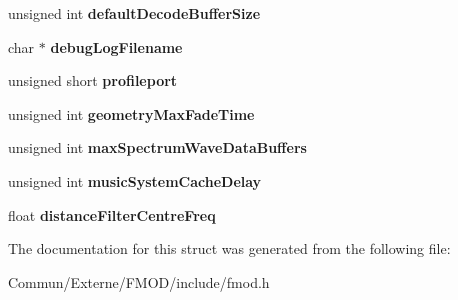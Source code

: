 \begin{DoxyCompactItemize}
\item 
unsigned int {\bfseries default\+Decode\+Buffer\+Size}\hypertarget{struct_f_m_o_d___a_d_v_a_n_c_e_d_s_e_t_t_i_n_g_s_a8b2d2802cd34875f10d319c8f363e399}{}\label{struct_f_m_o_d___a_d_v_a_n_c_e_d_s_e_t_t_i_n_g_s_a8b2d2802cd34875f10d319c8f363e399}

\item 
char $\ast$ {\bfseries debug\+Log\+Filename}\hypertarget{struct_f_m_o_d___a_d_v_a_n_c_e_d_s_e_t_t_i_n_g_s_a00d10a918d3414c8f4bde3664f01b44f}{}\label{struct_f_m_o_d___a_d_v_a_n_c_e_d_s_e_t_t_i_n_g_s_a00d10a918d3414c8f4bde3664f01b44f}

\item 
unsigned short {\bfseries profileport}\hypertarget{struct_f_m_o_d___a_d_v_a_n_c_e_d_s_e_t_t_i_n_g_s_a5d12c84c6911facd30fcba7ab0dd7faa}{}\label{struct_f_m_o_d___a_d_v_a_n_c_e_d_s_e_t_t_i_n_g_s_a5d12c84c6911facd30fcba7ab0dd7faa}

\item 
unsigned int {\bfseries geometry\+Max\+Fade\+Time}\hypertarget{struct_f_m_o_d___a_d_v_a_n_c_e_d_s_e_t_t_i_n_g_s_a973568fb1ec638193a0b0198d4165558}{}\label{struct_f_m_o_d___a_d_v_a_n_c_e_d_s_e_t_t_i_n_g_s_a973568fb1ec638193a0b0198d4165558}

\item 
unsigned int {\bfseries max\+Spectrum\+Wave\+Data\+Buffers}\hypertarget{struct_f_m_o_d___a_d_v_a_n_c_e_d_s_e_t_t_i_n_g_s_a0404a31fe61b9d4e2340125a2a38a00d}{}\label{struct_f_m_o_d___a_d_v_a_n_c_e_d_s_e_t_t_i_n_g_s_a0404a31fe61b9d4e2340125a2a38a00d}

\item 
unsigned int {\bfseries music\+System\+Cache\+Delay}\hypertarget{struct_f_m_o_d___a_d_v_a_n_c_e_d_s_e_t_t_i_n_g_s_abb66bb0cce280bd12f4092d2b3f642d1}{}\label{struct_f_m_o_d___a_d_v_a_n_c_e_d_s_e_t_t_i_n_g_s_abb66bb0cce280bd12f4092d2b3f642d1}

\item 
float {\bfseries distance\+Filter\+Centre\+Freq}\hypertarget{struct_f_m_o_d___a_d_v_a_n_c_e_d_s_e_t_t_i_n_g_s_aec899d9cc69d0d664393d48f87dd9373}{}\label{struct_f_m_o_d___a_d_v_a_n_c_e_d_s_e_t_t_i_n_g_s_aec899d9cc69d0d664393d48f87dd9373}

\end{DoxyCompactItemize}


The documentation for this struct was generated from the following file\+:\begin{DoxyCompactItemize}
\item 
Commun/\+Externe/\+F\+M\+O\+D/include/fmod.\+h\end{DoxyCompactItemize}
